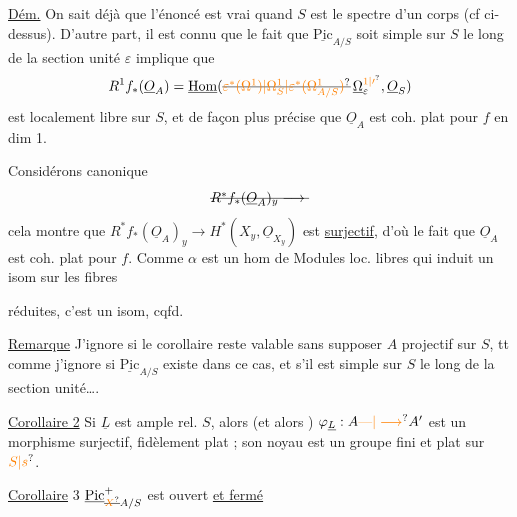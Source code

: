 \uline{Dém.} On sait déjà que l'énoncé est vrai quand $S$ est le spectre d'un corps (cf ci-dessus).  D'autre part, il est connu que le fait que $\underline{\mathrm{Pic}}_{A/S}$ soit simple sur $S$ le long de la section unité $\varepsilon$ implique que
\[
R^1f_*(\underline O_A)=\underline{\mathrm{Hom}}(\deleted{\unsure{\varepsilon^*(\Omega^1)|\Omega^1_{S}|\varepsilon^*(\Omega^1_{A/S})}}\,\underline{\Omega}^{\unsure{1|\prime}}_\varepsilon,\underline O_S)
\]
est localement libre sur $S$, et de façon plus précise que $\underline O_A$ est coh. plat pour $f$ en dim 1.

Considérons    canonique
\[
\deleted{R^{*}f_*(\underline O_A)_y\longrightarrow{}}
\]
cela montre que $R^*f_*(\underline O_A)_y\to H^{*}(X_y,\underline O_{X_y})$ est \uline{surjectif}, d'où le fait que $\underline O_A$ est coh. plat pour $f$. Comme $\alpha$ est un hom de Modules loc. libres qui induit un isom sur les fibres

réduites, c'est un isom, cqfd.

\uline{Remarque} J'ignore si le corollaire reste valable sans supposer $A$ projectif sur $S$, tt comme j'ignore si $\underline{\mathrm{Pic}}_{A/S}$ existe dans ce cas, et s'il est  simple sur $S$ le long de la section unité\ldots.

\uline{Corollaire 2} Si $\underline L$ est ample rel.  $S$, alors (et alors ) $\varphi_{\underline L}:A\unsure{\text{---}|\longrightarrow} A'$ est un morphisme surjectif,   fidèlement plat ; son noyau est un groupe fini et plat sur $\unsure{S|s}$.

\uline{Corollaire} 3 $\underline{\mathrm{Pic}}^+_{\deleted{\unsure{X}}A/S}$ est ouvert \uline{et fermé}

